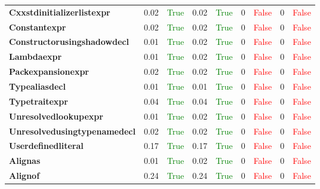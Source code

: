 \documentclass{article}
\begin{document}
\begin{xltabular}{\textwidth}{lcccccccc}
\textbf{{\fontsize{10}{12}\selectfont Cxxstdinitializerlistexpr}}& 0.02&\textcolor{green}{True}& 0.02&\textcolor{green}{True}& 0&\textcolor{red}{False}& 0&\textcolor{red}{False} \\[0.5ex]
\textbf{{\fontsize{10}{12}\selectfont Constantexpr}}& 0.02&\textcolor{green}{True}& 0.02&\textcolor{green}{True}& 0&\textcolor{red}{False}& 0&\textcolor{red}{False} \\[0.5ex]
\textbf{{\fontsize{10}{12}\selectfont Constructorusingshadowdecl}}& 0.01&\textcolor{green}{True}& 0.02&\textcolor{green}{True}& 0&\textcolor{red}{False}& 0&\textcolor{red}{False} \\[0.5ex]
\textbf{{\fontsize{10}{12}\selectfont Lambdaexpr}}& 0.01&\textcolor{green}{True}& 0.02&\textcolor{green}{True}& 0&\textcolor{red}{False}& 0&\textcolor{red}{False} \\[0.5ex]
\textbf{{\fontsize{10}{12}\selectfont Packexpansionexpr}}& 0.02&\textcolor{green}{True}& 0.02&\textcolor{green}{True}& 0&\textcolor{red}{False}& 0&\textcolor{red}{False} \\[0.5ex]
\textbf{{\fontsize{10}{12}\selectfont Typealiasdecl}}& 0.01&\textcolor{green}{True}& 0.01&\textcolor{green}{True}& 0&\textcolor{red}{False}& 0&\textcolor{red}{False} \\[0.5ex]
\textbf{{\fontsize{10}{12}\selectfont Typetraitexpr}}& 0.04&\textcolor{green}{True}& 0.04&\textcolor{green}{True}& 0&\textcolor{red}{False}& 0&\textcolor{red}{False} \\[0.5ex]
\textbf{{\fontsize{10}{12}\selectfont Unresolvedlookupexpr}}& 0.01&\textcolor{green}{True}& 0.02&\textcolor{green}{True}& 0&\textcolor{red}{False}& 0&\textcolor{red}{False} \\[0.5ex]
\textbf{{\fontsize{10}{12}\selectfont Unresolvedusingtypenamedecl}}& 0.02&\textcolor{green}{True}& 0.02&\textcolor{green}{True}& 0&\textcolor{red}{False}& 0&\textcolor{red}{False} \\[0.5ex]
\textbf{{\fontsize{10}{12}\selectfont Userdefinedliteral}}& 0.17&\textcolor{green}{True}& 0.17&\textcolor{green}{True}& 0&\textcolor{red}{False}& 0&\textcolor{red}{False} \\[0.5ex]
\textbf{{\fontsize{10}{12}\selectfont Alignas}}& 0.01&\textcolor{green}{True}& 0.02&\textcolor{green}{True}& 0&\textcolor{red}{False}& 0&\textcolor{red}{False} \\[0.5ex]
\textbf{{\fontsize{10}{12}\selectfont Alignof}}& 0.24&\textcolor{green}{True}& 0.24&\textcolor{green}{True}& 0&\textcolor{red}{False}& 0&\textcolor{red}{False} \\[0.5ex]

\end{xltabular}
\end{document}
